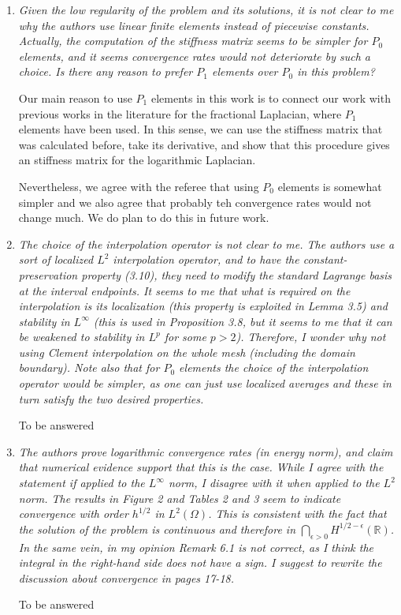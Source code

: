 \documentclass[11 pt]{article}
\numberwithin{equation}{section}
\begin{document}
\begin{enumerate}
    \item \emph{Given the low regularity of the problem and its solutions, it is not clear to me why the authors use linear finite elements instead of piecewise constants. Actually, the computation of the stiffness matrix seems to be simpler for \(P_{0}\) elements, and it seems convergence rates would not deteriorate by such a choice. Is there any reason to prefer \(P_{1}\) elements over \(P_{0}\) in this problem?}

    Our main reason to use $P_1$ elements in this work is to connect our work with previous works in the literature for the fractional Laplacian, where $P_1$ elements have been used. In this sense, we can use the stiffness matrix that was calculated before, take its derivative, and show that this procedure gives an stiffness matrix for the logarithmic Laplacian.

    Nevertheless, we agree with the referee that using $P_0$ elements is somewhat simpler and we also agree that probably teh convergence rates would not change much.  We do plan to do this in future work.



    \item \emph{The choice of the interpolation operator is not clear to me. The authors use a sort of localized \(L^{2}\) interpolation operator, and to have the constant-preservation property (3.10), they need to modify the standard Lagrange basis at the interval endpoints. It seems to me that what is required on the interpolation is its localization (this property is exploited in Lemma 3.5) and stability in \(L^{\infty}\) (this is used in Proposition 3.8, but it seems to me that it can be weakened to stability in \(L^{p}\) for some \(p>2\)). Therefore, I wonder why not using Clement interpolation on the whole mesh (including the domain boundary). Note also that for \(P_{0}\) elements the choice of the interpolation operator would be simpler, as one can just use localized averages and these in turn satisfy the two desired properties.}

    {\color{red}To be answered}

    \item \emph{The authors prove logarithmic convergence rates (in energy norm), and claim that numerical evidence support that this is the case. While I agree with the statement if applied to the \(L^{\infty}\) norm, I disagree with it when applied to the \(L^{2}\) norm. The results in Figure 2 and Tables 2 and 3 seem to indicate convergence with order \(h^{1/2}\) in \(L^{2}(\Omega)\). This is consistent with the fact that the solution of the problem is continuous and therefore in \(\bigcap_{\epsilon>0}H^{1/2-\epsilon}(\mathbb{R})\). In the same vein, in my opinion Remark 6.1 is not correct, as I think the integral in the right-hand side does not have a sign. I suggest to rewrite the discussion about convergence in pages 17-18.}

    {\color{red}To be answered}

\end{enumerate}
\end{document}
